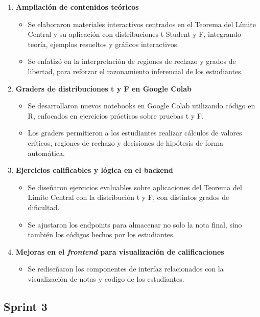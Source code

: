 \documentclass[letter,oneside,12pt,spanish]{report}
\begin{document}
\begin{enumerate}
	\item \textbf{Ampliación de contenidos teóricos}  
	\begin{itemize}
		\item Se elaboraron materiales interactivos centrados en el Teorema del Límite Central y su aplicación con distribuciones t-Student y F, integrando teoría, ejemplos resueltos y gráficos interactivos.
		\item Se enfatizó en la interpretación de regiones de rechazo y grados de libertad, para reforzar el razonamiento inferencial de los estudiantes.
	\end{itemize}
	
	\item \textbf{Graders de distribuciones t y F en Google Colab}  
	\begin{itemize}
		\item Se desarrollaron nuevos notebooks en Google Colab utilizando código en R, enfocados en ejercicios prácticos sobre pruebas t y F.
		\item Los graders permitieron a los estudiantes realizar cálculos de valores críticos, regiones de rechazo y decisiones de hipótesis de forma automática.
	\end{itemize}
	
	\item \textbf{Ejercicios calificables y lógica en el backend}  
	\begin{itemize}
		\item Se diseñaron ejercicios evaluables sobre aplicaciones del Teorema del Límite Central con la distribución t y F, con distintos grados de dificultad.
		\item Se ajustaron los endpoints para almacenar no solo la nota final, sino también los códigos hechos por los estudiantes.
	\end{itemize}
	
	\item \textbf{Mejoras en el \textit{frontend} para visualización de calificaciones}  
	\begin{itemize}
		\item Se rediseñaron los componentes de interfaz relacionados con la visualización de notas y codigo de los estudiantes.
	\end{itemize}
\end{enumerate}

\subsection{Sprint 3}
\end{document}
